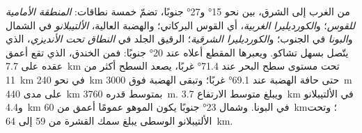من الغرب إلى الشرق، بين نحو \ang{15} و\ang{27} جنوبًا، تضمّ خمسة نطاقات:
\emph{المنطقة الأمامية للقوس}؛ و\emph{الكورديليرا الغربية}، أي القوس البركاني؛ والهضبة العالية،
\emph{الألتيبلانو} في الشمال و\emph{البونا} في الجنوب؛ و\emph{الكورديليرا
الشرقية}؛  الرقيق الجلد في \emph{النطاق تحت الأنديزي}، الذي
يتّصل بسهل تشاكو. ويعبرها المقطع أعلاه عند \ang{20} جنوبًا: فمن الخندق،
الذي تقع أعمق عقده على \qty{7.7}{km} تحت مستوى سطح البحر عند \ang{71.4} غربًا، يصعد السطح
أكثر من \qty{11}{km} في نحو \qty{240}{km} حتى حافة الهضبة عند \ang{69.1} غربًا؛
وتبقى الهضبة فوق \qty{3000}{m} على مدى \qty{440}{km} بمتوسط
قدره \qty{3760}{m}. ويبلغ متوسط الارتفاع \qty{3.7}{km} في الألتيبلانو و\qty{4.4}{km} في
البونا. وشمال \ang{23} جنوبًا يكون الموهو عمومًا أعمق من \qty{60}{km}؛ وتحت
الألتيبلانو الوسطى يبلغ سمك القشرة من 59 إلى \qty{64}{km}.

